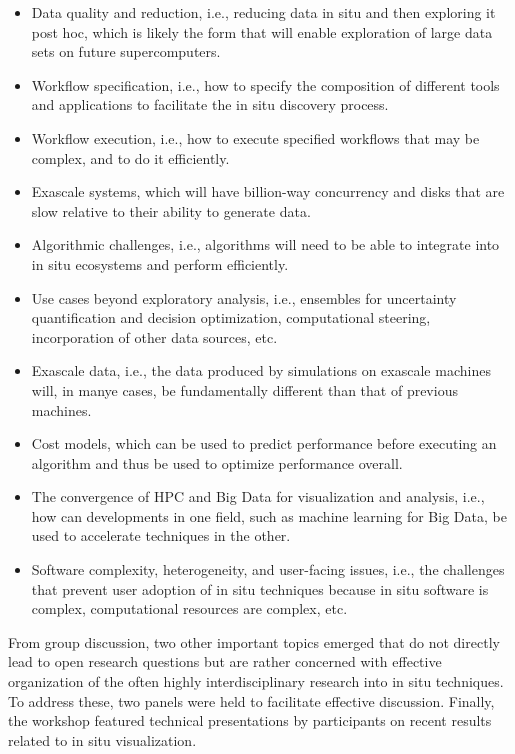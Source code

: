 \begin{itemize}
    \item Data quality and reduction, i.e., reducing data in situ and then exploring it post hoc, which is likely the form that will enable exploration of large data sets on future supercomputers.
    \item Workflow specification, i.e., how to specify the composition of different tools and applications to facilitate the in situ discovery process.
    \item Workflow execution, i.e., how to execute specified workflows that may be complex, and to do it efficiently.
    \item Exascale systems, which will have billion-way concurrency and disks that are slow relative to their ability to generate data.
    \item Algorithmic challenges, i.e., algorithms will need to be able to integrate into in situ ecosystems and perform efficiently.
    \item Use cases beyond exploratory analysis, i.e., ensembles for uncertainty quantification and decision optimization, computational steering, incorporation of other data sources, etc.
    \item Exascale data, i.e., the data produced by simulations on exascale machines will, in manye cases, be fundamentally different than that of previous machines.
    \item Cost models, which can be used to predict performance before executing an algorithm and thus be used to optimize performance overall.
    \item The convergence of HPC and Big Data for visualization and analysis, i.e., how can developments in one field, such as machine learning for Big Data, be used to accelerate techniques in the other. 
    \item Software complexity, heterogeneity, and user-facing issues, i.e., the challenges that prevent user adoption of in situ techniques because in situ software is complex, computational resources are complex, etc.
\end{itemize}

\noindent
From group discussion, two other important topics emerged that do not directly lead to open research questions but are rather concerned with effective organization of the often highly interdisciplinary research into in situ techniques. To address these, two panels were held to facilitate effective discussion. Finally, the workshop featured technical presentations by participants on recent results related to in situ visualization.
